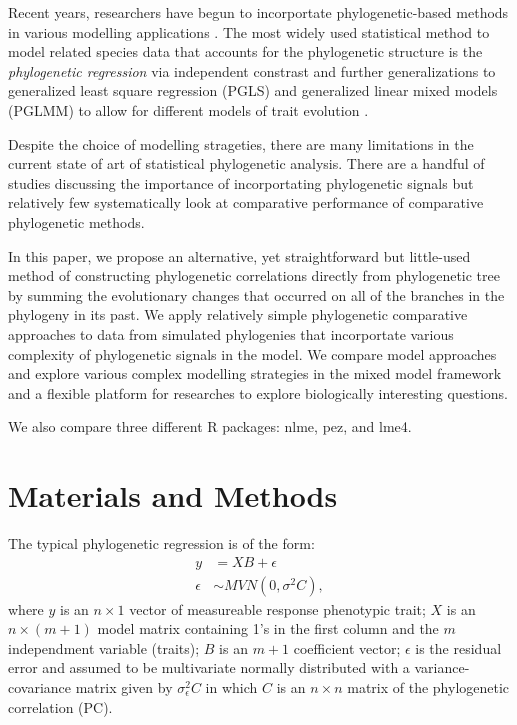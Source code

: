\documentclass[12pt]{article}
\begin{document}
Recent years, researchers have begun to incorportate phylogenetic-based methods in various modelling applications .
The most widely used statistical method to model related species data that accounts for the phylogenetic structure is the \textit{phylogenetic regression} via independent constrast  and further generalizations to generalized least square regression (PGLS) and generalized linear mixed models (PGLMM) to allow for different models of trait evolution . 


Despite the choice of modelling strageties, there are many limitations in the current state of art of statistical phylogenetic analysis.
There are a handful of studies discussing the importance of incorportating phylogenetic signals but relatively few systematically look at comparative performance of comparative phylogenetic methods. 

In this paper, we propose an alternative, yet straightforward but little-used method of constructing phylogenetic correlations directly from phylogenetic tree by summing the evolutionary changes that occurred on all of the branches in the phylogeny in its past.
We apply relatively simple phylogenetic comparative approaches to data from simulated phylogenies that incorportate various complexity of phylogenetic signals in the model. 
We compare model approaches and explore various complex modelling strategies in the mixed model framework and a flexible platform for researches to explore biologically interesting questions.

We also compare three different R packages: nlme, pez, and lme4. 

\section{Materials and Methods}

The typical phylogenetic regression is of the form:
\begin{align}
y & = XB + \epsilon \\
\epsilon & \sim MVN(0,\sigma^{2}C),
\label{eq:gls}
\end{align}
where $y$ is an $n \times 1$ vector of measureable response phenotypic trait; $X$ is an $n \times (m + 1)$ model matrix containing 1's in the first column and the $m$ independment variable (traits); $B$ is an $m + 1$ coefficient vector; $\epsilon$ is the residual error and assumed to be multivariate normally distributed with a variance-covariance matrix given by $\sigma^{2}_{\epsilon}C$ in which $C$ is an $n \times n$ matrix of the phylogenetic correlation (PC).
\end{document}
